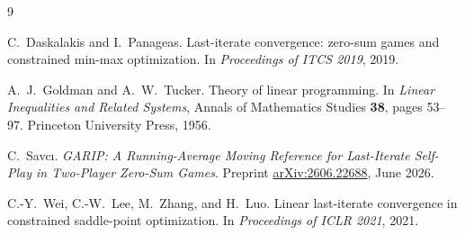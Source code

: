 \documentclass[11pt]{article}
\theoremstyle{plain}
\theoremstyle{definition}
\theoremstyle{remark}
\begin{document}
\begin{thebibliography}{9}

C.~Daskalakis and I.~Panageas.
Last-iterate convergence: zero-sum games and constrained min-max optimization.
In \emph{Proceedings of ITCS 2019}, 2019.

A.~J.~Goldman and A.~W.~Tucker.
Theory of linear programming.
In \emph{Linear Inequalities and Related Systems}, Annals of Mathematics Studies \textbf{38}, pages 53--97. Princeton University Press, 1956.

C.~Savc\i.
\emph{GARIP: A Running-Average Moving Reference for Last-Iterate Self-Play in Two-Player Zero-Sum Games}.
Preprint \href{https://arxiv.org/abs/2606.22688}{arXiv:2606.22688}, June 2026.

C.-Y.~Wei, C.-W.~Lee, M.~Zhang, and H.~Luo.
Linear last-iterate convergence in constrained saddle-point optimization.
In \emph{Proceedings of ICLR 2021}, 2021.

\end{thebibliography}
\end{document}
